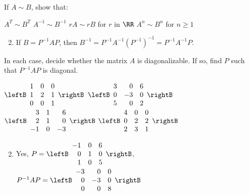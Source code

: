 \begin{multicols}{2}
\begin{ex}
If $A \sim B$, show that:

\begin{exenumerate}
\exitem $A^{T} \sim B^{T}$
\exitem $A^{-1} \sim B^{-1}$
\exitem $rA \sim rB$ for $r$ in $\RR$
\exitem $A^{n} \sim B^{n}$ for $n \geq 1$
\end{exenumerate}
\begin{sol}
\begin{enumerate}[label={\alph*.}]
\setcounter{enumi}{1}
\item  If $B = P^{-1}AP$, then $B^{-1} = P^{-1}A^{-1}(P^{-1})^{-1} = P^{-1}A^{-1}P$.

\end{enumerate}
\end{sol}
\end{ex}

\begin{ex}
In each case, decide whether the matrix $A$ is diagonalizable. If so, find $P$ such that $P^{-1}AP$ is diagonal.

\begin{exenumerate}
\exitem $\leftB \begin{array}{rrr}
1 & 0 & 0 \\
1 & 2 & 1 \\
0 & 0 & 1
\end{array} \rightB$
\exitem $\leftB \begin{array}{rrr}
3 &  0 & 6 \\
0 & -3 & 0 \\
5 &  0 & 2
\end{array} \rightB$
\exitem $\leftB \begin{array}{rrr}
 3 &  1 &  6 \\
 2 &  1 &  0 \\
-1 &  0 & -3 
\end{array} \rightB$
\exitem $\leftB \begin{array}{rrr}
4 & 0 & 0 \\
0 & 2 & 2 \\
2 & 3 & 1
\end{array} \rightB$
\end{exenumerate}
\begin{sol}
\begin{enumerate}[label={\alph*.}]
\setcounter{enumi}{1}
\item  Yes, $ P =
\leftB \begin{array}{rrr}
-1 & 0 & 6 \\
 0 & 1 & 0 \\
 1 & 0 & 5
\end{array} \rightB$, $P^{-1}AP = 
\leftB \begin{array}{rrr}
-3 &  0 & 0 \\
 0 & -3 & 0 \\
 0 &  0 & 8
\end{array} \rightB$


\end{enumerate}
\end{sol}
\end{ex}
\end{multicols}
